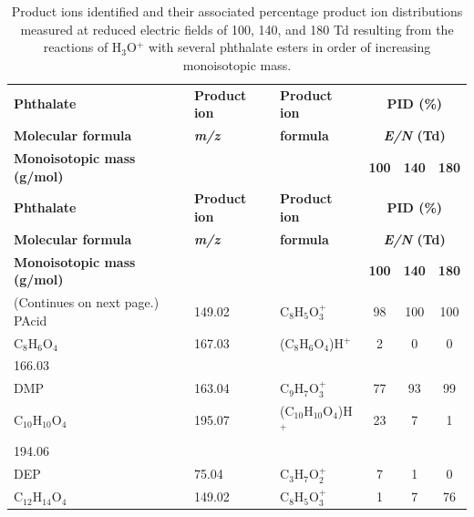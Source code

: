 {\small

\begin{longtable}[c]{lllccc}
\caption{Product ions identified and their associated percentage product ion distributions measured at reduced electric fields of 100, 140, and 180 Td resulting
from the reactions of H$_3$O$^+$ with several phthalate esters in order of increasing monoisotopic mass.} 
\label{table:PID}\\
\hline 
\textbf{Phthalate}& \textbf{Product ion} & \textbf{Product ion}  & \multicolumn{3}{c}{\textbf{PID (\%)}} \\ \cline{4-6} 
\textbf{Molecular formula} & \textbf{\textit{m/z}}&   \textbf{formula }& \multicolumn{3}{c}{\textbf{\textit{E/N} (Td)}} \\ \cline{4-6} 
\textbf{Monoisotopic mass (g/mol)  }      &                      &                     & \textbf{100 }     & \textbf{140}     & \textbf{180}  \\
\hline
\endfirsthead
\hline 
\textbf{Phthalate}& \textbf{Product ion} & \textbf{Product ion}  & \multicolumn{3}{c}{\textbf{PID (\%)}} \\ \cline{4-6} 
\textbf{Molecular formula} & \textbf{\textit{m/z}}&   \textbf{formula }& \multicolumn{3}{c}{\textbf{\textit{E/N} (Td)}} \\ \cline{4-6} 
\textbf{Monoisotopic mass (g/mol)  }      &                      &                     & \textbf{100 }     & \textbf{140}     & \textbf{180}  \\
\hline
\endhead
%
  (Continues on next page.)
\endfoot
%
\endlastfoot
PAcid   & 149.02  & C$_8$H$_5$O$_3^+$  & 98  & 100  & 100   \\
C$_8$H$_6$O$_4$  & 167.03  & (C$_8$H$_6$O$_4$)H$^+$  & 2  & 0  & 0  \\
166.03  & & & & &  \\
\hline
DMP       &    163.04    &  C$_9$H$_7$O$_3^+$   & 77 & 93 & 99   \\
C$_{10}$H$_{10}$O$_4$          &    195.07            & (C$_{10}$H$_{10}$O$_4$)H$^+$ & 23& 7& 1\\
194.06          & &  & & & \\
\hline
DEP       & 75.04                & C$_3$H$_7$O$_2^+$      & 7            & 1            & 0            \\
C$_{12}$H$_{14}$O$_4$          & 149.02               & C$_8$H$_5$O$_3^+$      & 1            & 7            & 76           \\

\end{longtable}}
